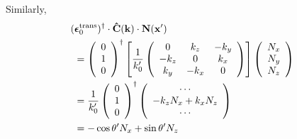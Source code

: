 \documentclass[letterpaper]{article}
\newcommand{\vbEps}{\boldsymbol{\epsilon}}
\begin{document}
Similarly, 
\begin{align*}
&\hspace{-0.05in}
 (\vbEps_0\sups{trans})^\dagger \cdot
 \vbhat{C}(\vb k) \cdot \vb N(\vb x^\prime)
\\
&=
 \left(\begin{array}{c}0 \\ 1 \\ 0\end{array}\right)^\dagger
 \left[ \frac{1}{k_0^{\prime}}
        \left(\begin{array}{ccc}
               0       & k_z     & -k_y    \\
               -k_z    & 0       & k_x     \\
               k_y     & -k_x    & 0
              \end{array}
        \right)
 \right]
 \left(\begin{array}{c}N_x \\ N_y \\ N_z\end{array}\right)
\\
&=
 \frac{1}{k_0^\prime}
 \left(\begin{array}{c}0 \\ 1 \\ 0\end{array}\right)^\dagger
 \left(\begin{array}{c} \cdots \\ -k_z N_x + k_x N_z \\ \cdots
       \end{array}\right)
\\
&=-\cos\theta^\prime N_x + \sin\theta^\prime N_z
\end{align*}

%
%
%
\end{document}
